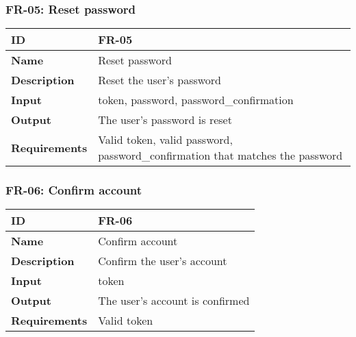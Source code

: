     \subsubsection{FR-05: Reset password}
    \begin{center}
        \begin{tabularx}{\textwidth}{|l|X|}
            \hline
            \textbf{ID} & FR-05 \\
            \hline
            \textbf{Name} & Reset password \\
            \hline
            \textbf{Description} & Reset the user's password \\
            \hline
            \textbf{Input} & token, password, password\_confirmation \\
            \hline
            \textbf{Output} & The user's password is reset \\
            \hline
            \textbf{Requirements} & Valid token, valid password, password\_confirmation that matches the password \\
            \hline
        \end{tabularx}
    \end{center}
    
    

    \subsubsection{FR-06: Confirm account}
    \begin{center}
        \begin{tabularx}{\textwidth}{|l|X|}
            \hline
            \textbf{ID} & FR-06 \\
            \hline
            \textbf{Name} & Confirm account \\
            \hline
            \textbf{Description} & Confirm the user's account \\
            \hline
            \textbf{Input} & token \\
            \hline
            \textbf{Output} & The user's account is confirmed \\
            \hline
            \textbf{Requirements} & Valid token \\
            \hline
        \end{tabularx}
    \end{center}
    
    

